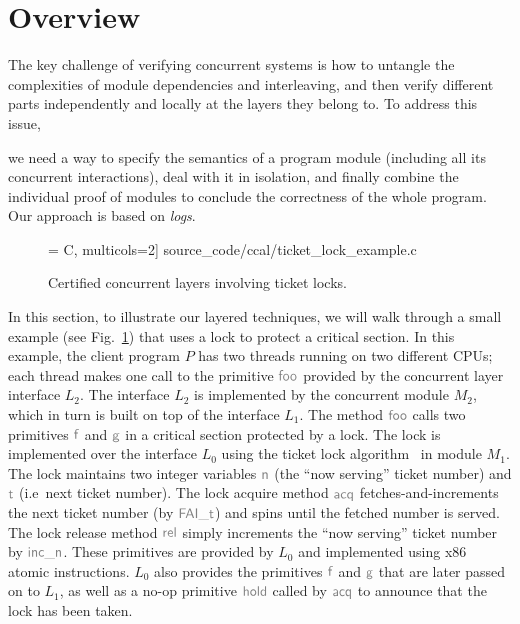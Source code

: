 \section{Overview}
\label{sec:informal}
The key challenge of verifying concurrent systems is how to untangle 
the complexities of module dependencies and interleaving, 
and then verify different parts independently and locally at the layers they belong to. 
To address this issue, 

we need a way
to specify the semantics of a program module (including all its
concurrent interactions), deal with it in isolation, and finally
combine the individual proof of modules to
conclude the correctness of the whole program. 
 Our approach is based on
\emph{logs}.

\begin{figure}
 = C, multicols=2] {source_code/ccal/ticket_lock_example.c}
\caption{Certified concurrent layers involving ticket locks.}
\label{fig:exp:ticket_lock_example}
\end{figure}

In this section, to illustrate our layered techniques, we will walk through a small  example
(see Fig.~\ref{fig:exp:ticket_lock_example}) that uses a lock to protect a
critical section. In this example, the client program $P$ has two threads running on
two different CPUs; each thread makes one call to the primitive
$\commc{foo}$ provided by the concurrent  layer interface $L_2$. 
The interface
$L_2$ is implemented by the concurrent  module $M_2$, which in
turn is built on top of the interface $L_1$. The method $\commc{foo}$
calls two primitives $\commc{f}$ and $\commc{g}$ in a critical section
protected by a lock.  The lock is implemented over the
interface $L_0$ using the ticket lock
algorithm~\cite{mcs91} in module $M_1$.  The lock maintains two 
integer variables $\commc{n}$ (the ``now serving'' ticket number) and $\commc{t}$ (i.e\, next ticket number). The lock acquire method $\commc{acq}$ fetches-and-increments the next ticket number (by $\commc{FAI\_t}$) 
and spins until the fetched  number is served.
The lock release method $\commc{rel}$ simply increments the ``now serving'' ticket number by $\commc{inc\_n}$. These primitives are provided by $L_0$ and  implemented using x86 atomic instructions. $L_0$ also provides the primitives $\commc{f}$ and $\commc{g}$ that are later passed on to $L_1$,
as well as a no-op primitive $\commc{hold}$ called by $\commc{acq}$ to
announce that the lock has been taken.


